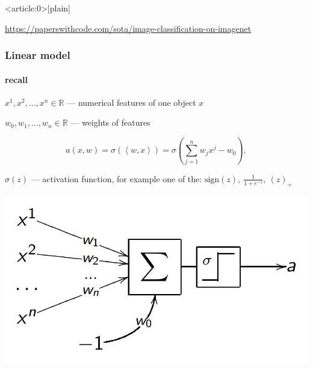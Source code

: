 \documentclass[fullscreen=true, bookmarks=true, hyperref={pdfencoding=unicode}]{beamer}
\begin{document}
{ %
    \begin{frame}<article:0>[plain]
        
        \vspace{8cm}
        \href{https://paperswithcode.com/sota/image-classification-on-imagenet}{https://paperswithcode.com/sota/image-classification-on-imagenet}
     \end{frame}
}


\begin{frame}
  \frametitle{Linear model}
  \framesubtitle{recall}

 $x^1, x^2, \dots, x^n \in \mathbb{R}$ — numerical features of one object $x$
 
 $w_0, w_1, \dots, w_n \in \mathbb{R}$ — weights of features
 
 $$a(x, w) = \sigma(\left<w, x\right>) = \sigma \left(\sum\limits_{j=1}^n w_j x^j - w_0 \right),$$
 
 $\sigma(z)$ — activation function, for example one of the:
 $\text{sign}(z),\ \frac{1}{1+e^{-z}},\ (z)_+$

\begin{center}
  \includegraphics[keepaspectratio, width=.5\paperwidth]{lin_as_nn.jpg}
\end{center}
\end{frame}
\end{document}
